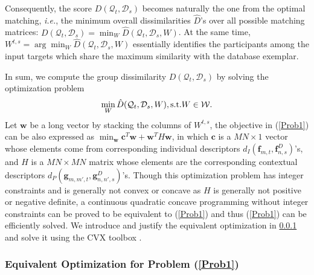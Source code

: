 Consequently, the score $D(\mathcal{Q}_{t}, \mathcal{D}_{s})$ becomes naturally the one from the optimal matching, \textit{i.e.}, the minimum overall dissimilarities $\hat{D}$'s over all possible matching matrices: $D(\mathcal{Q}_{t}, \mathcal{D}_{s})=\min_{W}\hat{D}(\mathcal{Q}_{t}, \mathcal{D}_{s}, W)$. At the same time, $W^{t,s}=\arg\min_{W}\hat{D}(\mathcal{Q}_{t}, \mathcal{D}_{s}, W)$ essentially identifies the participants among the input targets which share the maximum similarity with the database exemplar. 
 
 In sum, we compute the group dissimilarity $D(\mathcal{Q}_{t}, \mathcal{D}_{s})$ by solving the optimization problem
\begin{equation}
\label{Prob1}
\min_{W}\hat{D}(\mathcal{Q}_{t}, \mathcal{D}_{s}, W), \textup{s.t.} W\in\mathcal{W}.
\end{equation}
Let $\mathbf{w}$ be a long vector by stacking the columns of $W^{t,s}$, the objective in (\ref{Prob1}) can be also expressed as $\min_{\mathbf{w}}\mathbf{c}^{T}\mathbf{w}+\mathbf{w}^{T}H\mathbf{w}$, in which $\mathbf{c}$ is a $MN\times 1$ vector whose elements come from corresponding individual descriptors $d_{I}(\mathbf{f}_{m,t}, \mathbf{f}^{D}_{n,s})$'s, and $H$ is a $MN\times MN$ matrix whose elements are the corresponding contextual descriptors $d_{P}(\mathbf{g}_{m,m',t}, \mathbf{g}^{D}_{n,n',s})$'s. Though this optimization problem has integer constraints and is generally not convex or concave as $H$ is generally not positive or negative definite, a continuous quadratic concave programming without integer constraints can be proved to be equivalent to (\ref{Prob1}) and thus (\ref{Prob1}) can be efficiently solved. We introduce and justify the equivalent optimization in \ref{proof} and solve it using the CVX toolbox \cite{cvx}.

\subsubsection{Equivalent Optimization for Problem (\ref{Prob1})}
\label{proof}

